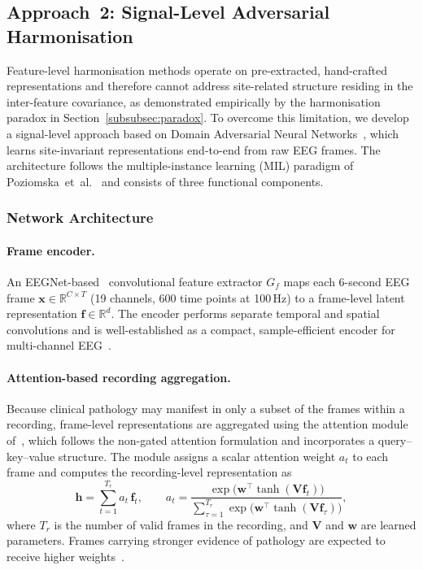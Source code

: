 \documentclass[preprint,12pt]{elsarticle}
\begin{document}
\subsection{Approach~2: Signal-Level Adversarial Harmonisation}
\label{subsec:approach2_dann}

Feature-level harmonisation methods operate on pre-extracted,
hand-crafted representations and therefore cannot address site-related
structure residing in the inter-feature covariance, as demonstrated
empirically by the harmonisation paradox in
Section~\ref{subsubsec:paradox}.
To overcome this limitation, we develop a signal-level approach based
on Domain Adversarial Neural Networks~\cite{ganin2016domain}, which
learns site-invariant representations end-to-end from raw EEG frames.
The architecture follows the multiple-instance learning (MIL)
paradigm of Poziomska~et~al.~\cite{poziomska2026quantity} and consists
of three functional components.

\subsubsection{Network Architecture}
\label{subsubsec:dann_arch}

\paragraph{Frame encoder.}
An EEGNet-based~\cite{lawhern2018eegnet} convolutional feature
extractor $G_f$ maps each 6-second EEG frame
$\mathbf{x} \in \mathbb{R}^{C \times T}$ (19 channels, 600 time
points at 100\,Hz) to a frame-level latent representation
$\mathbf{f} \in \mathbb{R}^d$.
The encoder performs separate temporal and spatial convolutions and
is well-established as a compact, sample-efficient encoder for
multi-channel EEG~\cite{lawhern2018eegnet,poziomska2026quantity}.

\paragraph{Attention-based recording aggregation.}
Because clinical pathology may manifest in only a subset of the
frames within a recording, frame-level representations are aggregated
using the attention module of~\cite{poziomska2026quantity}, which
follows the non-gated attention formulation and incorporates a
query--key--value structure.
The module assigns a scalar attention weight $a_t$ to each frame and
computes the recording-level representation as
\begin{equation}
  \mathbf{h} = \sum_{t=1}^{T_r} a_t\, \mathbf{f}_t,
  \qquad
  a_t = \frac{\exp\!\bigl(\mathbf{w}^\top
              \tanh(\mathbf{V}\mathbf{f}_t)\bigr)}
             {\sum_{\tau=1}^{T_r}
              \exp\!\bigl(\mathbf{w}^\top
              \tanh(\mathbf{V}\mathbf{f}_\tau)\bigr)},
  \label{eq:attention}
\end{equation}
where $T_r$ is the number of valid frames in the recording, and
$\mathbf{V}$ and $\mathbf{w}$ are learned parameters.
Frames carrying stronger evidence of pathology are expected to receive
higher weights~\cite{poziomska2026quantity}.
\end{document}
